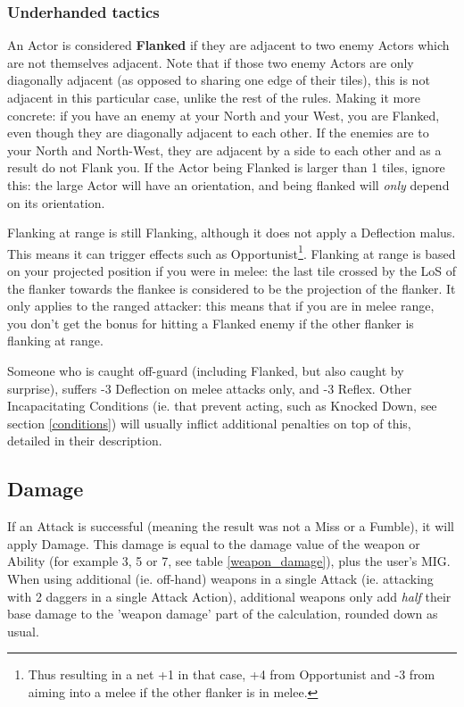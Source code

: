 \subsubsection{Underhanded tactics}

An Actor is considered \textbf{Flanked} if they are adjacent to two enemy Actors which are not themselves adjacent. Note that if those two enemy Actors are only diagonally adjacent (as opposed to sharing one edge of their tiles), this is not adjacent in this particular case, unlike the rest of the rules. Making it more concrete: if you have an enemy at your North and your West, you are Flanked, even though they are diagonally adjacent to each other. If the enemies are to your North and North-West, they are adjacent by a side to each other and as a result do not Flank you. If the Actor being Flanked is larger than 1 tiles, ignore this: the large Actor will have an orientation, and being flanked will \textit{only} depend on its orientation. 

Flanking at range is still Flanking, although it does not apply a Deflection malus. This means it can trigger effects such as Opportunist\footnote{Thus resulting in a net +1 in that case, +4 from Opportunist and -3 from aiming into a melee if the other flanker is in melee.}. Flanking at range is based on your projected position if you were in melee: the last tile crossed by the LoS of the flanker towards the flankee is considered to be the projection of the flanker. It only applies to the ranged attacker: this means that if you are in melee range, you don't get the bonus for hitting a Flanked enemy if the other flanker is flanking at range.

Someone who is caught off-guard (including Flanked, but also caught by surprise), suffers -3 Deflection on melee attacks only, and -3 Reflex. Other Incapacitating Conditions (ie. that prevent acting, such as Knocked Down, see section \ref{conditions}) will usually inflict additional penalties on top of this, detailed in their description.


\subsection{Damage}

If an Attack is successful (meaning the result was not a Miss or a Fumble), it will apply Damage. This damage is equal to the damage value of the weapon or Ability (for example 3, 5 or 7, see table \ref{weapon_damage}), plus the user's MIG. When using additional (ie. off-hand) weapons in a single Attack (ie. attacking with 2 daggers in a single Attack Action), additional weapons only add \textit{half} their base damage to the 'weapon damage' part of the calculation, rounded down as usual. 

